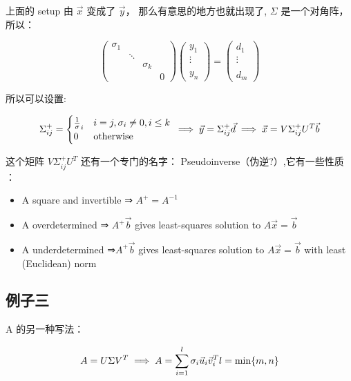\documentclass[
]{book}
\providecommand{\tightlist}{%
  \setlength{\itemsep}{0pt}\setlength{\parskip}{0pt}}
\begin{document}
上面的 setup 由 \(\vec{x}\) 变成了 \(\vec{y}\)， 那么有意思的地方也就出现了, \(\Sigma\) 是一个对角阵，所以：

\[
\begin{pmatrix} \sigma_1  & & \\ & \ddots &  \\  & & \sigma_k & \\ & & & 0 \end{pmatrix} 
\begin{pmatrix} y_1 \\  \vdots \\  \\  y_n \end{pmatrix} 
= \begin{pmatrix} d_1 \\ \vdots  \\ \\ d_m\end{pmatrix}
\]

所以可以设置:

\[
\Sigma_{ij}^+ =  \begin{cases}
\frac{1}{\sigma}_i & i = j, \sigma_i \ne 0,  i \le k\\
0 & \text{otherwise}
\end{cases} \\
\implies \vec{y} = \Sigma_{ij}^+ \vec{d} \\
\implies \vec{x} = V \Sigma_{ij}^+ U^T \vec{b}
\]

这个矩阵 \(V \Sigma_{ij}^+ U^T\) 还有一个专门的名字： Pseudoinverse（伪逆?）,它有一些性质 ：

\begin{itemize}
\tightlist
\item
  A square and invertible ⇒ \(A^+ = A^{−1}\)
\item
  A overdetermined ⇒ \(A^+\vec{b}\) gives least-squares solution to \(A\vec{x} = \vec{b}\)
\item
  A underdetermined ⇒\(A^+\vec{b}\) gives least-squares solution to \(A\vec{x} = \vec{b}\) with least (Euclidean) norm
\end{itemize}

\hypertarget{ux4f8bux5b50ux4e09}{%
\subsection{例子三}\label{ux4f8bux5b50ux4e09}}

A 的另一种写法：

\[A = U \Sigma V^T \implies A = \sum_{i = 1}^l \sigma_i \vec{u}_i \vec{v}_i^T\\
l = \text{min}\{ m, n\}\]
\end{document}
